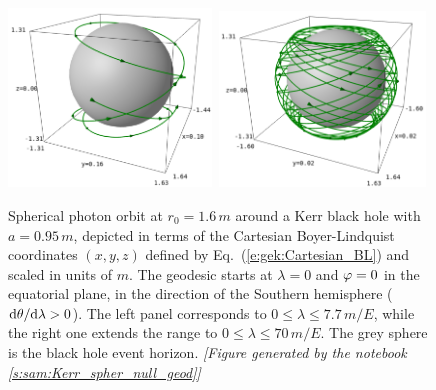 \begin{figure}
\centerline{\includegraphics[width=0.48\textwidth]{gik_spher_3d_r_16_l077.png}\
\includegraphics[width=0.49\textwidth]{gik_spher_3d_r_16_l700.png}}
\caption[]{\label{f:gik:spher_3d_r_16} \footnotesize
Spherical photon orbit at $r_0=1.6 \, m$ around a Kerr black hole with
$a=0.95\, m$, depicted in terms of the Cartesian Boyer-Lindquist coordinates
$(x,y,z)$ defined by Eq.~(\ref{e:gek:Cartesian_BL}) and scaled in units of $m$.
The geodesic starts at $\lambda=0$ and $\varphi=0$ in the equatorial plane, in the direction
of the Southern hemisphere ($\mathrm{d}\theta/\mathrm{d}\lambda>0$).
The left panel corresponds to $0 \leq \lambda \leq 7.7\, m/E$,
while the right one extends the range to $0 \leq \lambda \leq 70\, m/E$.
The grey sphere is the black hole event horizon.
\textsl{[Figure generated by the notebook \ref{s:sam:Kerr_spher_null_geod}]}
}
\end{figure}


